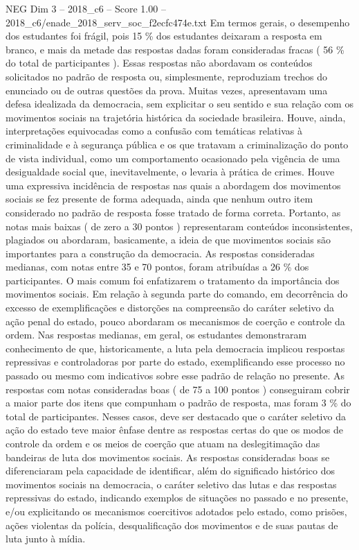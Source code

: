 \begin{textsample}{NEG Dim 3 – 2018\_c6 – Score 1.00 – 2018\_c6/enade\_2018\_serv\_soc\_f2ecfc474e.txt}
Em termos gerais, o desempenho dos estudantes foi frágil, pois 15 \% dos estudantes deixaram a resposta em branco, e mais da metade das respostas dadas foram consideradas fracas ( 56 \% do total de participantes ).
Essas respostas não abordavam os conteúdos solicitados no padrão de resposta ou, simplesmente, reproduziam trechos do enunciado ou de outras questões da prova.
Muitas vezes, apresentavam uma defesa idealizada da democracia, sem explicitar o seu sentido e sua relação com os movimentos sociais na trajetória histórica da sociedade brasileira.
Houve, ainda, interpretações equivocadas como a confusão com temáticas relativas à criminalidade e à segurança pública e os que tratavam a criminalização do ponto de vista individual, como um comportamento ocasionado pela vigência de uma desigualdade social que, inevitavelmente, o levaria à prática de crimes.
Houve uma expressiva incidência de respostas nas quais a abordagem dos movimentos sociais se fez presente de forma adequada, ainda que nenhum outro item considerado no padrão de resposta fosse tratado de forma correta.
Portanto, as notas mais baixas ( de zero a 30 pontos ) representaram conteúdos inconsistentes, plagiados ou abordaram, basicamente, a ideia de que movimentos sociais são importantes para a construção da democracia.
As respostas consideradas medianas, com notas entre 35 e 70 pontos, foram atribuídas a 26 \% dos participantes.
O mais comum foi enfatizarem o tratamento da importância dos movimentos sociais.
Em relação à segunda parte do comando, em decorrência do excesso de exemplificações e distorções na compreensão do caráter seletivo da ação penal do estado, pouco abordaram os mecanismos de coerção e controle da ordem.
Nas respostas medianas, em geral, os estudantes demonstraram conhecimento de que, historicamente, a luta pela democracia implicou respostas repressivas e controladoras por parte do estado, exemplificando esse processo no passado ou mesmo com indicativos sobre esse padrão de relação no presente.
As respostas com notas consideradas boas ( de 75 a 100 pontos ) conseguiram cobrir a maior parte dos itens que compunham o padrão de resposta, mas foram 3 \% do total de participantes.
Nesses casos, deve ser destacado que o caráter seletivo da ação do estado teve maior ênfase dentre as respostas certas do que os modos de controle da ordem e os meios de coerção que atuam na deslegitimação das bandeiras de luta dos movimentos sociais.
As respostas consideradas boas se diferenciaram pela capacidade de identificar, além do significado histórico dos movimentos sociais na democracia, o caráter seletivo das lutas e das respostas repressivas do estado, indicando exemplos de situações no passado e no presente, e/ou explicitando os mecanismos coercitivos adotados pelo estado, como prisões, ações violentas da polícia, desqualificação dos movimentos e de suas pautas de luta junto à mídia.

\end{textsample}
